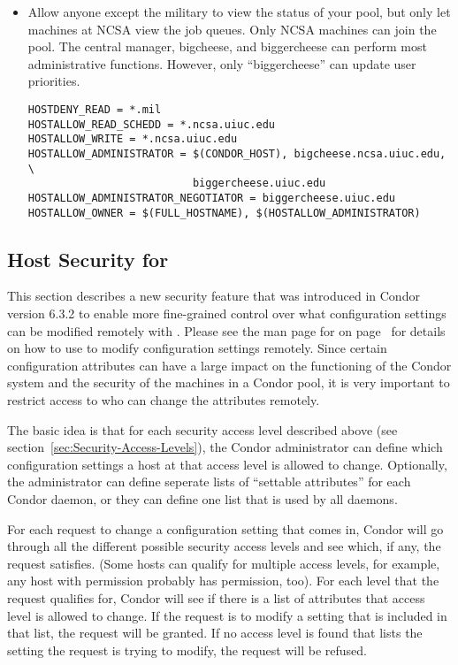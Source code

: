 \begin{itemize}
\item Allow anyone except the military to view the status of your
pool, but only let machines at NCSA view the job queues.  Only NCSA
machines can join the pool. The central manager, bigcheese, and
biggercheese can perform most administrative functions.  However, only
``biggercheese'' can update user priorities.
\begin{verbatim}
HOSTDENY_READ = *.mil
HOSTALLOW_READ_SCHEDD = *.ncsa.uiuc.edu 
HOSTALLOW_WRITE = *.ncsa.uiuc.edu
HOSTALLOW_ADMINISTRATOR = $(CONDOR_HOST), bigcheese.ncsa.uiuc.edu, \
                          biggercheese.uiuc.edu
HOSTALLOW_ADMINISTRATOR_NEGOTIATOR = biggercheese.uiuc.edu
HOSTALLOW_OWNER = $(FULL_HOSTNAME), $(HOSTALLOW_ADMINISTRATOR)
\end{verbatim}

\end{itemize}


\subsection{\label{sec:Config-Val-Security} Host Security for
}

This section describes a new security feature that was introduced in
Condor version 6.3.2 to enable more fine-grained control over what
configuration settings can be modified remotely with
.
Please see the man page for  on
page~\pageref{man-condor-config-val} for details on how to use 
\Condor{config\_val} to modify configuration settings remotely. 
Since certain configuration attributes can have a large impact on the 
functioning of the Condor system and the security of the machines in a
Condor pool, it is very important to restrict access to who can change
the attributes remotely.

The basic idea is that for each security access level described above
(see section~\ref{sec:Security-Access-Levels}), the Condor
administrator can define which configuration settings a host at that
access level is allowed to change.
Optionally, the administrator can define seperate lists of ``settable
attributes'' for each Condor daemon, or they can define one list that
is used by all daemons.

For each request to change a configuration setting that comes in,
Condor will go through all the different possible security access
levels and see which, if any, the request satisfies.
(Some hosts can qualify for multiple access levels, for example, any
host with \DCPerm{ADMINISTRATOR} permission probably has
 permission, too).
For each level that the request qualifies for, Condor will see if
there is a list of attributes that access level is allowed to change.
If the request is to modify a setting that is included in that list,
the request will be granted.
If no access level is found that lists the setting the request is
trying to modify, the request will be refused.

